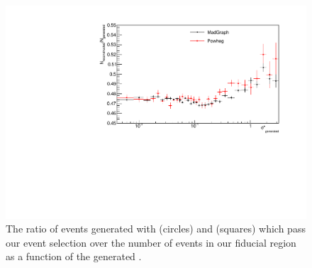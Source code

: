 \begin{figure}[!htbp]
    \centering
    \includegraphics[width=\textwidth]{figures/EventEff.pdf}
    \caption[
        The fraction of \Ztoee events generated with \MADGRAPH and \POWHEG that
        pass our selection criteria.
    ]{
        The ratio of \Ztoee events generated with \MADGRAPH (circles) and
        \POWHEG (squares) which pass our event selection over the number of
        events in our fiducial region as a function of the generated \phistar.
    }
    \label{fig:average_efficiencies}
\end{figure}
